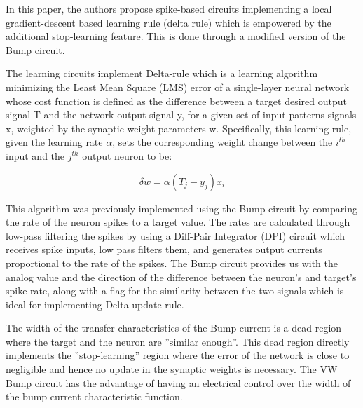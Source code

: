 \documentclass[main]{subfiles}
\begin{document}
In this paper, the authors propose spike-based circuits implementing a local  gradient-descent  based  learning  rule  (delta  rule)  which is empowered by the additional stop-learning feature. This is done through a modified version of the Bump circuit.

The learning circuits implement Delta-rule which is a learning algorithm minimizing the Least Mean Square (LMS) error of a single-layer neural network whose cost function is defined as the difference between a target desired output signal T and the network output signal y, for a given set of input patterns signals x, weighted by the synaptic weight parameters w. Specifically, this learning rule, given the learning rate $\alpha$, sets the corresponding weight change between the $i^{th}$ input and the $j^{th}$ output neuron to be:

\begin{equation}
    \delta w = \alpha (T_j-y_j)x_i
\end{equation}

This algorithm was previously implemented using the Bump circuit by comparing the rate of the neuron spikes to a target value. The rates are calculated through low-pass filtering the spikes by using a Diff-Pair Integrator (DPI) circuit which receives spike inputs, low pass filters them, and generates output currents proportional to the rate of the spikes. The Bump circuit provides us with the analog value and the direction of the difference between the neuron’s and target’s spike rate, along with a flag for the similarity between the two signals which is ideal for implementing Delta update rule. 


The width of the transfer characteristics of the Bump current is a dead region where the target and the neuron are ”similar enough”. This dead region directly implements the ”stop-learning” region where the error of the network is close to negligible and hence no update in the synaptic weights is necessary. The VW Bump circuit has the advantage of having an electrical control over the width of the bump current characteristic function.
\end{document}
